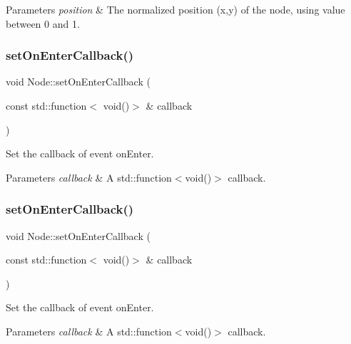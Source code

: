 \begin{DoxyParams}{Parameters}
{\em position} & The normalized position (x,y) of the node, using value between 0 and 1. \\
\hline
\end{DoxyParams}
\mbox{\label{classNode_a69c42f72323ef791d720b9083f480cb4}} 
\subsubsection{\texorpdfstring{set\+On\+Enter\+Callback()}{setOnEnterCallback()}\hspace{0.1cm}{\footnotesize\ttfamily [1/2]}}
{\footnotesize\ttfamily void Node\+::set\+On\+Enter\+Callback (\begin{DoxyParamCaption}\item[{const std\+::function$<$ void()$>$ \&}]{callback }\end{DoxyParamCaption})\hspace{0.3cm}{\ttfamily [inline]}}

Set the callback of event on\+Enter. 
\begin{DoxyParams}{Parameters}
{\em callback} & A std\+::function$<$void()$>$ callback. \\
\hline
\end{DoxyParams}
\mbox{\label{classNode_a69c42f72323ef791d720b9083f480cb4}} 
\subsubsection{\texorpdfstring{set\+On\+Enter\+Callback()}{setOnEnterCallback()}\hspace{0.1cm}{\footnotesize\ttfamily [2/2]}}
{\footnotesize\ttfamily void Node\+::set\+On\+Enter\+Callback (\begin{DoxyParamCaption}\item[{const std\+::function$<$ void()$>$ \&}]{callback }\end{DoxyParamCaption})\hspace{0.3cm}{\ttfamily [inline]}}

Set the callback of event on\+Enter. 
\begin{DoxyParams}{Parameters}
{\em callback} & A std\+::function$<$void()$>$ callback. \\
\hline
\end{DoxyParams}
\mbox{\label{classNode_aad666c48b3a6952c3c4b6c4c1eb446ad}} 
